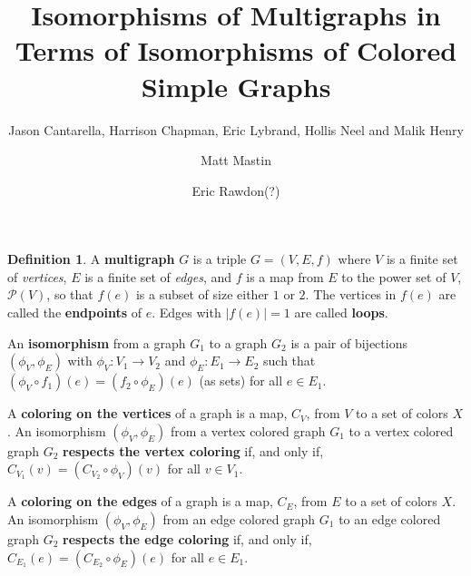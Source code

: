 \documentclass[amsmath,secnumarabic,floatfix,amssymb,nofootinbib,nobibnotes,letterpaper,11pt,tightenlines,showkeys]{revtex4}
\theoremstyle{definition}
\newtheorem{definition}[theorem]{Definition}
\newcommand{\abs}[1]{\lvert#1\rvert}
\newcommand{\m}{\mathcal}
\begin{document}
\title[]{Isomorphisms of Multigraphs in Terms of Isomorphisms of Colored Simple Graphs}
\author{Jason Cantarella, Harrison Chapman, Eric Lybrand, Hollis Neel and Malik Henry}
\noaffiliation
\author{Matt Mastin}
\noaffiliation
\author{Eric Rawdon(?)}
\noaffiliation

\maketitle

\begin{definition}
	A \textbf{multigraph} $G$ is a triple $G = (V,E,f)$ where $V$ is a finite set of \emph{vertices}, $E$ is a finite set of \emph{edges}, and $f$ is a map from $E$ to the power set of $V$, $\m{P}(V)$, so that $f(e)$ is a subset of size either $1$ or $2$. The vertices in $f(e)$ are called the \textbf{endpoints} of $e$. Edges with $\abs{f(e)}=1$ are called \textbf{loops}.

An \textbf{isomorphism} from a graph $G_1$ to a graph $G_2$ is a pair of bijections $(\phi_V,\phi_E)$ with $\phi_V: V_1 \rightarrow V_2$ and $\phi_E: E_1 \rightarrow E_2$ such that $(\phi_V \circ f_1)(e)=(f_2 \circ \phi_E)(e)$ (as sets) for all $e \in E_1$.

A \textbf{coloring on the vertices} of a graph is a map, $C_V$, from $V$ to a set of colors $X$. An isomorphism $(\phi_V, \phi_E)$ from a vertex colored graph $G_1$ to a vertex colored graph $G_2$ \textbf{respects the vertex coloring} if, and only if, $C_{V_1}(v) = (C_{V_2} \circ \phi_V)(v)$ for all $v \in V_1$. 

A \textbf{coloring on the edges} of a graph is a map, $C_E$, from $E$ to a set of colors $X$. An isomorphism $(\phi_V, \phi_E)$ from an edge colored graph $G_1$ to an edge colored graph $G_2$ \textbf{respects the edge coloring} if, and only if, $C_{E_1}(e) = (C_{E_2} \circ \phi_E)(e)$ for all $e \in E_1$. 



\end{definition}
\end{document}
